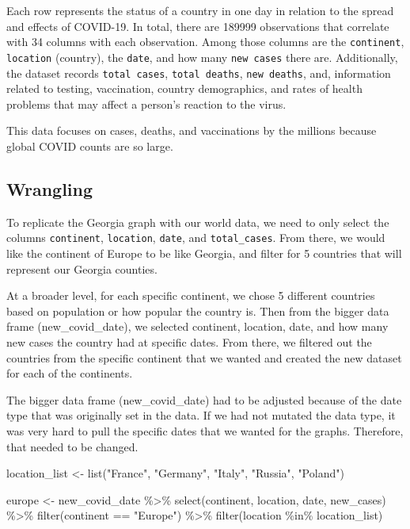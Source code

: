 \documentclass[
]{article}
\newenvironment{Shaded}{\begin{snugshade}}{\end{snugshade}}
\newcommand{\FunctionTok}[1]{\textcolor[rgb]{0.00,0.00,0.00}{#1}}
\newcommand{\NormalTok}[1]{#1}
\newcommand{\OtherTok}[1]{\textcolor[rgb]{0.56,0.35,0.01}{#1}}
\newcommand{\SpecialCharTok}[1]{\textcolor[rgb]{0.00,0.00,0.00}{#1}}
\newcommand{\StringTok}[1]{\textcolor[rgb]{0.31,0.60,0.02}{#1}}
\begin{document}
Each row represents the status of a country in one day in relation to
the spread and effects of COVID-19. In total, there are 189999
observations that correlate with 34 columns with each observation. Among
those columns are the \texttt{continent}, \texttt{location} (country),
the \texttt{date}, and how many \texttt{new\ cases} there are.
Additionally, the dataset records \texttt{total\ cases},
\texttt{total\ deaths}, \texttt{new\ deaths}, and, information related
to testing, vaccination, country demographics, and rates of health
problems that may affect a person's reaction to the virus.

This data focuses on cases, deaths, and vaccinations by the millions
because global COVID counts are so large.

\hypertarget{wrangling}{%
\subsection{Wrangling}\label{wrangling}}

To replicate the Georgia graph with our world data, we need to only
select the columns \texttt{continent}, \texttt{location}, \texttt{date},
and \texttt{total\_cases}. From there, we would like the continent of
Europe to be like Georgia, and filter for 5 countries that will
represent our Georgia counties.

At a broader level, for each specific continent, we chose 5 different
countries based on population or how popular the country is. Then from
the bigger data frame (new\_covid\_date), we selected continent,
location, date, and how many new cases the country had at specific
dates. From there, we filtered out the countries from the specific
continent that we wanted and created the new dataset for each of the
continents.

The bigger data frame (new\_covid\_date) had to be adjusted because of
the date type that was originally set in the data. If we had not mutated
the data type, it was very hard to pull the specific dates that we
wanted for the graphs. Therefore, that needed to be changed.

\begin{Shaded}
\begin{Highlighting}[]
\NormalTok{location\_list }\OtherTok{\textless{}{-}} \FunctionTok{list}\NormalTok{(}\StringTok{"France"}\NormalTok{, }\StringTok{"Germany"}\NormalTok{, }\StringTok{"Italy"}\NormalTok{, }\StringTok{"Russia"}\NormalTok{, }\StringTok{"Poland"}\NormalTok{)}

\NormalTok{europe }\OtherTok{\textless{}{-}}\NormalTok{ new\_covid\_date }\SpecialCharTok{\%\textgreater{}\%} 
  \FunctionTok{select}\NormalTok{(continent, location, date, new\_cases) }\SpecialCharTok{\%\textgreater{}\%} 
  \FunctionTok{filter}\NormalTok{(continent }\SpecialCharTok{==} \StringTok{"Europe"}\NormalTok{) }\SpecialCharTok{\%\textgreater{}\%} 
  \FunctionTok{filter}\NormalTok{(location }\SpecialCharTok{\%in\%}\NormalTok{ location\_list)}
\end{Highlighting}
\end{Shaded}
\end{document}
